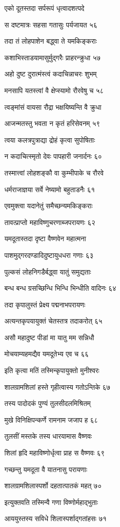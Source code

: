 एको दूतस्तदा सर्परूपं धृत्वादशत्पदे

स दष्टमात्रः सहसा गतासुः पर्यजायत ५६

तदा तं लोहपाशेन बद्ध्वा ते यमकिङ्कराः

कशाभिस्ताडयामासुर्मुद्गरैः प्राहरन्क्रुधा ५७

अहो दुष्ट दुरात्मंस्त्वं कदाचिन्नाचरः शुभम्

मनसापि यतस्त्वां वै क्षेप्स्यामो रौरवेषु च ५८

त्वङ्मांसं वायसा रौद्रा भक्षयिष्यन्ति वै क्रुधा

आजन्मतस्तु भवता न कृतं हरिसेवनम् ५९

त्वया कलत्रपुत्राद्या द्रोहं कृत्वा सुपोषिताः

न कदाचित्स्मृतो देवः पापहारी जनार्दनः ६०

तस्मात्त्वां लोहशङ्कौ वा कुम्भीपाके च रौरवे

धर्मराजाज्ञया सर्वे नेष्यामो बहुताडनैः ६१

एवमुक्त्वा यदानेतुं समैच्छन्यमकिङ्कराः

तावत्प्राप्तो महाविष्णुचरणाब्जपरायणः ६२

यमदूतास्तदा दृष्टा वैष्णवेन महात्मना

पाशमुद्गरदण्डादिदुष्टायुधधरा गणाः ६३

पुल्कसं लोहनिगडैर्बद्ध्वा यातुं समुद्यताः

बन्ध बन्ध ग्रसच्छिन्धि भिन्धि भिन्धीति वादिनः ६४

तदा कृपालुस्तं प्रेक्ष्य पद्मनाभपरायणः

अत्यन्तकृपयायुक्तं चेतस्तत्र तदाकरोत् ६५

असौ महादुष्ट पीडां मा यातु मम सन्निधौ

मोचयाम्यहमद्यैव यमदूतेभ्य एव च ६६

इति कृत्वा मतिं तस्मिन्कृपायुक्तो मुनीश्वरः

शालग्रामशिलां हस्ते गृहीत्वास्य गतोऽन्तिके ६७

तस्य पादोदकं पुण्यं तुलसीदलमिश्रितम्

मुखे विनिक्षिपन्कर्णे रामनाम जजाप ह ६८

तुलसीं मस्तके तस्य धारयामास वैष्णवः

शिलां हृदि महाविष्णोर्धृत्वा प्राह स वैष्णवः ६९

गच्छन्तु यमदूता वै यातनासु परायणाः

शालग्रामशिलास्पर्शो दहतात्पातकं महत् ७०

इत्युक्तवति तस्मिन्वै गणा विष्णोर्महाद्भुताः

आययुस्तस्य सविधे शिलास्पर्शाद्गतांहसः ७१

